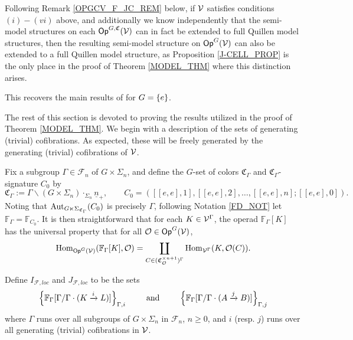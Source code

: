 \documentclass[a4paper,10pt
,draft
]{article}%
\renewcommand{\F}{\mathcal F}
\renewcommand{\1}{\eta}%
\begin{document}
\begin{remark}
      \label{OPGCV_FULL_REM}
      Following Remark \ref{OPGCV_F_JC_REM} below, if $\mathcal V$ satisfies conditions $(i) - (vi)$ above,
      and additionally we know independently that
      the semi-model structures on each $\mathsf{Op}^{G, \mathfrak C}(\mathcal V)$ can in fact be extended to full Quillen model structures,
      then the resulting semi-model structure on $\mathsf{Op}^G(\mathcal V)$ can also be extended to a full Quillen model structure,
      as Proposition \ref{J-CELL_PROP} is the only place in the proof of Theorem \ref{MODEL_THM} where this distinction arises.
\end{remark}

\begin{remark}
      This recovers the main results of \cite{BM13, Cav} for $G = \left\{e\right\}$. 
\end{remark}



The rest of this section is devoted to proving the results utilized in the proof of Theorem \ref{MODEL_THM}.
We begin with a description of the sets of generating (trivial) cofibrations.
As expected, these will be freely generated by the generating (trivial) cofibrations of $\mathcal V$.

Fix a subgroup $\Gamma \in \F_n$ of $G \times \Sigma_n$,
and define the $G$-set of colors $\mathfrak C_\Gamma$ and $\mathfrak C_\Gamma$-signature $C_0$ by
\[
      \mathfrak C_\Gamma := \Gamma \backslash (G \times \Sigma_n) \cdot_{\Sigma_n} \underline{n}_+,
      \qquad
      C_0 = ([[e,e],1],[[e,e],2],\dots,[[e,e],n];[[e,e],0]).
\]
Noting that $\operatorname{Aut}_{G \ltimes \Sigma_{\mathfrak C_\Gamma}}(C_0)$ is precisely $\Gamma$,
following Notation \ref{FD_NOT} let $\mathbb F_\Gamma = \mathbb F_{C_0}$.
It is then straightforward that for each $K \in \mathcal V^\Gamma$,
the operad $\mathbb F_\Gamma[K]$ has the universal property that for all $\mathcal{O} \in \mathsf{Op}^G(\mathcal V)$,
\begin{equation}
      \operatorname{Hom}_{\mathsf{Op}^G(\mathcal V)}(\mathbb F_\Gamma[K], \mathcal{O}) = \mathop\coprod\limits_{C \in (\mathfrak C_{\mathcal{O}}^{\times n+1})^\Gamma}\operatorname{Hom}_{\mathcal V^\Gamma}(K, \mathcal{O}(C)).
\end{equation}

Define $I_{\F,loc}$ and $J_{\F, loc}$ to be the sets
\begin{equation}
      \label{FGAMMA_EQ}
      \left\{\mathbb F_\Gamma[\Gamma/\Gamma \cdot (K \xrightarrow{i} L)]\right\}_{\Gamma, i}
      \qquad \mbox{ and } \qquad
      \left\{\mathbb F_\Gamma[\Gamma/\Gamma \cdot (A \xrightarrow{j} B)]\right\}_{\Gamma,j}
\end{equation}
where $\Gamma$ runs over all subgroups of $G \times \Sigma_n$ in $\F_n$, $n \geq 0$,
and $i$ (resp. $j$) runs over all generating (trivial) cofibrations in $\mathcal V$.
\end{document}
